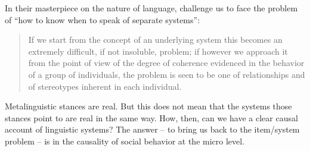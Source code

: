 In their masterpiece on the nature of language, \citet[8--9]{le_page_acts_1985} challenge us to face the problem of ``how to 
know when to speak of separate systems'': 



\begin{quotation}
If we start from the concept of an underlying system this becomes an 
extremely difficult, if not insoluble, problem; if however we approach 
it from the point of view of the degree of coherence evidenced in the 
behavior of a group of individuals, the problem is seen to be one of 
relationships and of stereotypes inherent in each individual.  
\end{quotation}




Metalinguistic stances are real. But this does not mean that the systems 
those stances point to are real in the same way. How, then, can we have a clear 
causal account of linguistic systems? The answer -- to bring us back to the 
item/system problem -- is in the causality of social behavior at the micro 
level.





